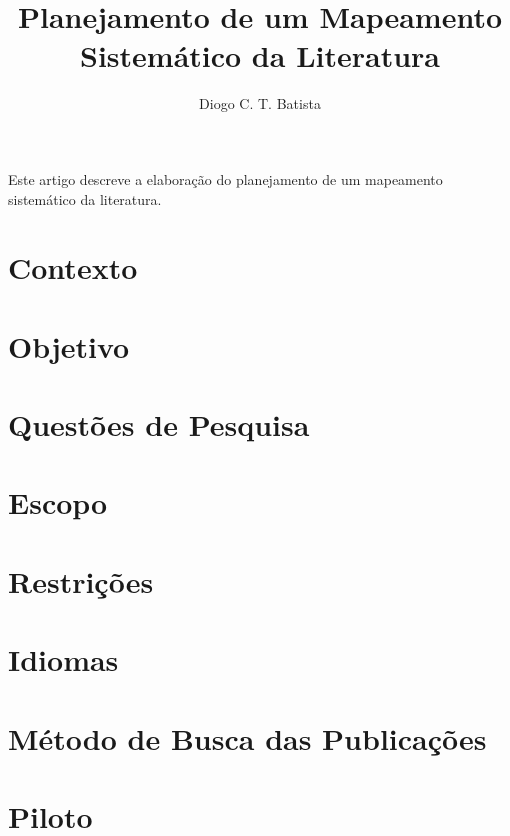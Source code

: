 \documentclass[12pt]{article}
\title{Planejamento de um Mapeamento Sistemático da Literatura}
\author{Diogo C. T. Batista\inst{1}}
\begin{document}
\maketitle

\begin{resumo}
  Este artigo descreve a elaboração do planejamento de um mapeamento sistemático da literatura.
\end{resumo}


\section{Contexto}

\section{Objetivo}

\section{Questões de Pesquisa}

\section{Escopo}

\section{Restrições}

\section{Idiomas}

\section{Método de Busca das Publicações}

\section{Piloto}



\end{document}

